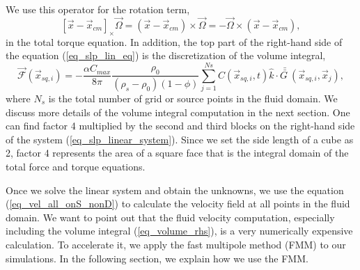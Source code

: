 We use this operator for the rotation term, 
 \[
  [\vec{x} - \vec{x}_{cm}]_{\times}  \vec{\Omega}
   = (\vec{x} - \vec{x}_{cm}) \times \vec{\Omega}
  = - \vec{\Omega} \times  (\vec{x} - \vec{x}_{cm}),
  \]
in the total torque equation.
In addition, the top part of the right-hand side of the equation (\ref{eq_slp_lin_eq}) is the discretization of the volume integral,
\begin{equation}
	{\vec{\mathcal{F}}} (\vec{x}_{sq,i}) = 
	-\frac{ \alpha C_{max}}{8\pi } \frac{\rho_0}{(\rho_s - \rho_0)(1-\phi)} 
   \sum_{j= 1}^{Ns}  C \left(\vec{x}_{sq,i},  t \right) \hat{k} \cdot
   \bar{\bar{G \ }}(\vec{x}_{sq, i}, \vec{x}_{j} ),
\label{eq_volume_rhs}
\end{equation}
   where $N_s$ is the total number of grid or source points in the fluid domain. We discuss more details of the volume integral computation in the next section. 
  One can find factor 4 multiplied by the second and third blocks on the right-hand side of the system (\ref{eq_slp_linear_system}). 
 Since we set the side length of a cube as 2, factor 4 represents the area of a square face that is the integral domain of the total force and torque equations. 
 \par
 Once we solve the linear system and obtain the unknowns, we use the equation (\ref{eq_vel_all_onS_nonD}) to calculate the velocity field at all points in the fluid domain. We want to point out that the fluid velocity computation, especially including the volume integral (\ref{eq_volume_rhs}), is a very numerically expensive calculation. To accelerate it, we apply the fast multipole method (FMM) to our simulations. In the following section, we explain how we use the FMM. 
